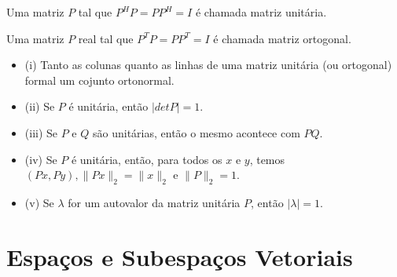 \documentclass[10pt,a4paper]{article}
\begin{document}
\begin{definition}
	Uma matriz $P$ tal que $P^HP = PP^H = I$ é chamada matriz unitária. 
\end{definition}

\begin{definition}
	Uma matriz $P$ real tal que $P^TP = PP^T = I$ é chamada matriz ortogonal.
\end{definition}

\begin{theorem}
	\begin{itemize}
		\item (i) Tanto as colunas quanto as linhas de uma matriz unitária (ou ortogonal) formal um cojunto ortonormal.
		\item (ii) Se $P$ é unitária, então $|det P| = 1$.
		\item (iii) Se $P$ e $Q$ são unitárias, então o mesmo acontece com $PQ$.
		\item (iv) Se $P$ é unitária, então, para todos os $x$ e $y$, temos $(Px, Py), \lVert Px \rVert_2 = \lVert x \rVert_2$ e $\lVert P \rVert_2 = 1$.
		\item (v) Se $\lambda$ for um autovalor da matriz unitária $P$, então $|\lambda| = 1$.
	\end{itemize}
\end{theorem}

\section{Espaços e Subespaços Vetoriais}
\end{document}
